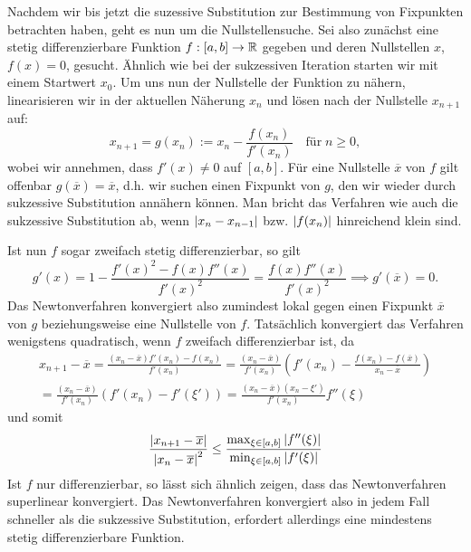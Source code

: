 Nachdem wir bis jetzt die suzessive Substitution zur Bestimmung von
Fixpunkten betrachten haben, geht es nun um die Nullstellensuche. Sei
also zunächst eine stetig differenzierbare Funktion $f:[a,b]\to\mathbb{R}$
gegeben und deren Nullstellen $x$, $f(x) = 0$, gesucht. Ähnlich wie
bei der sukzessiven Iteration starten wir mit einem Startwert
$x_0$. Um uns nun der Nullstelle der Funktion zu nähern, linearisieren
wir in der aktuellen Näherung $x_n$ und lösen nach der Nullstelle
$x_{n+1}$ auf:
\begin{equation}
  x_{n+1} = g(x_n) := x_n - \frac{f(x_n)}{f'(x_n)}\quad\text{für}\; n\ge 0,
\end{equation}
wobei wir annehmen, dass $f'(x)\neq 0$ auf $[a,b]$.  Für eine
Nullstelle $\overline{x}$ von $f$ gilt offenbar $g(\overline{x}) =
\overline{x}$, d.h. wir suchen einen Fixpunkt von $g$, den wir wieder
durch sukzessive Substitution annähern können. Man bricht das
Verfahren wie auch die sukzessive Substitution ab, wenn
$\left\lvert{x_{n}-x_{n-1}}\right\rvert$ bzw. $\left\lvert{f(x_n)}\right\rvert$ hinreichend klein sind.

Ist nun $f$ sogar zweifach stetig differenzierbar, so gilt
\begin{equation}
  g'(x) = 1 - \frac{f'(x)^2 - f(x)f''(x)}{f'(x)^2} =
  \frac{f(x)f''(x)}{f'(x)^2} \implies g'(\overline{x}) = 0.
\end{equation}
Das Newtonverfahren konvergiert also zumindest lokal gegen einen
Fixpunkt $\overline{x}$ von $g$ beziehungsweise eine Nullstelle von
$f$. Tatsächlich konvergiert das Verfahren wenigstens quadratisch,
wenn $f$ zweifach differenzierbar ist, da
\begin{align}
  x_{n+1} - \overline{x} = \frac{(x_n - \overline{x})f'(x_n) -
    f(x_n)}{f'(x_n)}
  = \frac{(x_n - \overline{x})}{f'(x_n)}\left( f'(x_n) -
    \frac{f(x_n) - f(\overline{x})}{x_n - \overline{x}}\right)\nonumber\\
  = \frac{(x_n - \overline{x})}{f'(x_n)}\left( f'(x_n) -
    f'(\xi')\right)
  = \frac{(x_n - \overline{x})(x_n - \xi')}{f'(x_n)}f''(\xi)
\end{align}
und somit
\begin{equation}
  \frac{\left\lvert{x_{n+1} - \overline{x}}\right\rvert}{\left\lvert{x_n - \overline{x}}\right\rvert^2}
  \le \frac{\max_{\xi\in [a,b]} \left\lvert{f''(\xi)}\right\rvert}{\min_{\xi\in [a,b]} \left\lvert{f'(\xi)}\right\rvert}
\end{equation}
Ist $f$ nur differenzierbar, so lässt sich ähnlich zeigen, dass das
Newtonverfahren superlinear konvergiert. Das Newtonverfahren
konvergiert also in jedem Fall schneller als die sukzessive
Substitution, erfordert allerdings eine mindestens stetig
differenzierbare Funktion.

